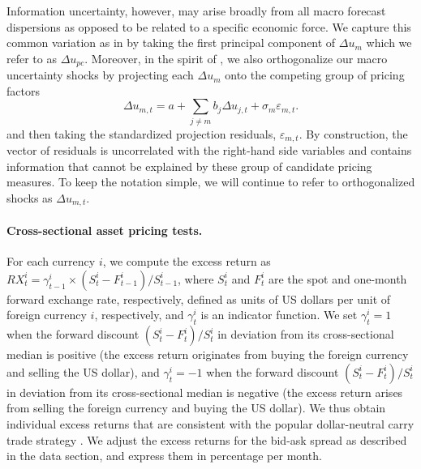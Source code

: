 Information uncertainty, however, may arise broadly from all macro forecast dispersions as opposed to be related to a specific economic force. We capture this common variation as in \citet{Bali:2015} by taking the first principal component of $\Delta u_{m}$ which we refer to as $\Delta u_{pc}$. Moreover, in the spirit of \citet{petkova:06}, we also orthogonalize our macro uncertainty shocks by projecting each $\Delta u_{m}$ onto the competing group of pricing factors
\begin{equation}\label{eq:orth}
\Delta u_{m,t}= a + \sum_{j \neq m} b_j \Delta u_{j,t} + \sigma_m \varepsilon_{m,t}.
\end{equation}
and then taking the standardized projection residuals, $\varepsilon_{m,t}$. By construction, the vector of residuals is uncorrelated with the right-hand side variables and contains information that cannot be explained by these group of candidate pricing measures. To keep the notation simple, we will continue to refer to orthogonalized shocks as $\Delta u_{m,t}$.

\paragraph{Cross-sectional asset pricing tests.}
For each currency $i$, we compute the excess return as $RX_{t}^{i}=\gamma_{t-1}^{i} \times (S_{t}^{i}-F_{t-1}^{i}) / S_{t-1}^{i} $, where $S_{t}^{i}$ and $F_{t}^{i}$ are the spot and one-month forward exchange rate, respectively, defined as units of US dollars per unit of foreign currency $i$, respectively, and $\gamma_{t}^{i}$ is an indicator function. We set $\gamma_{t}^{i} = 1$ when the forward discount $(S_{t}^{i}-F_{t}^{i})/S_{t}^{i}$ in deviation from its cross-sectional median is positive (the excess return originates from buying the foreign currency and selling the US dollar), and $\gamma_{t}^{i} = -1$ when the forward discount $(S_{t}^{i}-F_{t}^{i})/S_{t}^{i}$ in deviation from its cross-sectional median is negative (the excess return arises from selling the foreign currency and buying the US dollar). We thus obtain individual excess returns that are consistent with the popular dollar-neutral carry trade strategy \citep[e.g.,][]{lustig_etal2011}. We adjust the excess returns for the bid-ask spread as described in the data section, and express them in percentage per month.

